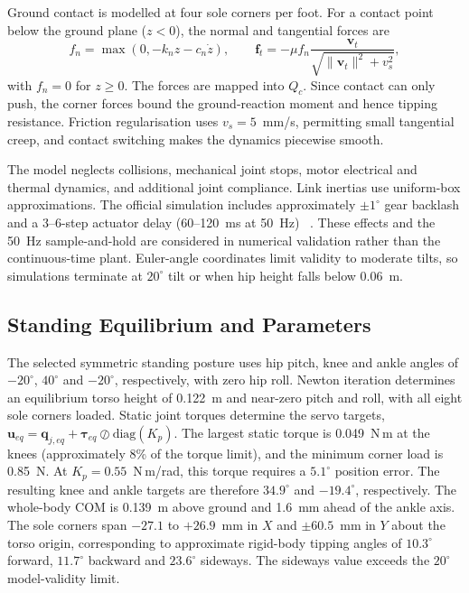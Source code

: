 \documentclass[conference,a4paper]{IEEEtran}
\begin{document}
Ground contact is modelled at four sole corners per foot. For a contact point below the ground plane ($z<0$), the normal and tangential forces are
\begin{equation*}
f_n=\max(0,-k_nz-c_n\dot z),\qquad \mathbf{f}_t=-\mu f_n\frac{\mathbf{v}_t}{\sqrt{\|\mathbf{v}_t\|^2+v_s^2}},
\end{equation*}
with $f_n=0$ for $z\geq0$. The forces are mapped into $Q_c$. Since contact can only push, the corner forces bound the ground-reaction moment and hence tipping resistance. %
Friction regularisation uses $v_s=5$~mm/s, permitting small tangential creep, and contact switching makes the dynamics piecewise smooth.

The model neglects collisions, mechanical joint stops, motor electrical and thermal dynamics, and additional joint compliance. Link inertias use uniform-box approximations. The official simulation includes approximately $\pm1^\circ$ gear backlash and a 3--6-step actuator delay (60--120~ms at 50~Hz) ~\cite{openmicroduck_sim}. These effects and the 50~Hz sample-and-hold are considered in numerical validation rather than the continuous-time plant. Euler-angle coordinates limit validity to moderate tilts, so simulations terminate at $20^\circ$ tilt or when hip height falls below 0.06~m.



\subsection{Standing Equilibrium and Parameters} 
The selected symmetric standing posture uses hip pitch, knee and ankle angles of $-20^\circ$, $40^\circ$ and $-20^\circ$, respectively, with zero hip roll. Newton iteration determines an equilibrium torso height of 0.122~m and near-zero pitch and roll, with all eight sole corners loaded. Static joint torques determine the servo targets, $\mathbf{u}_{eq}=\mathbf{q}_{j,eq}+\boldsymbol\tau_{eq}\oslash \mathrm{diag}(K_p)$. The largest static torque is 0.049~N\,m at the knees (approximately 8\% of the torque limit), and the minimum corner load is 0.85~N. At $K_p=0.55$~N\,m/rad, this torque requires a $5.1^\circ$ position error. The resulting knee and ankle targets are therefore $34.9^\circ$ and $-19.4^\circ$, respectively. The whole-body COM is 0.139~m above ground and 1.6~mm ahead of the ankle axis. The sole corners span $-27.1$ to $+26.9$~mm in $X$ and $\pm60.5$~mm in $Y$ about the torso origin, corresponding to approximate rigid-body tipping angles of $10.3^\circ$ forward, $11.7^\circ$ backward and $23.6^\circ$ sideways. The sideways value exceeds the $20^\circ$ model-validity limit.
\end{document}
